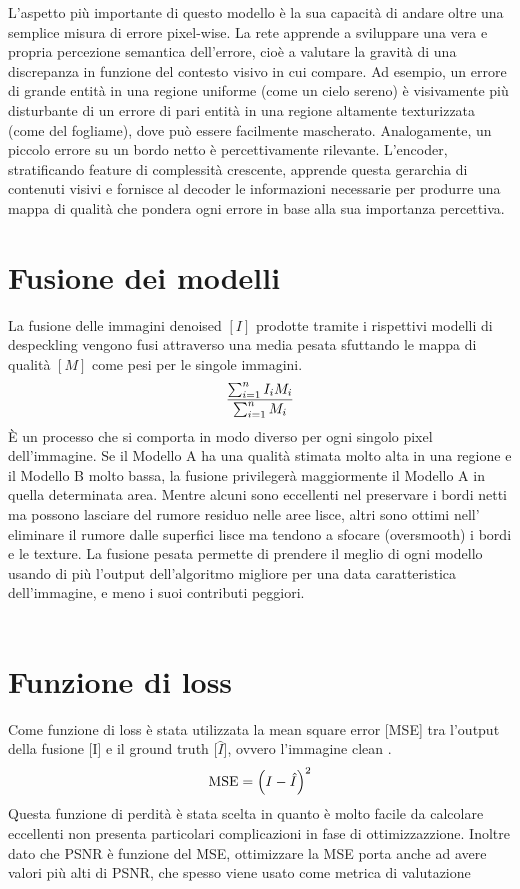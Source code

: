 L’aspetto più importante di questo modello è la sua capacità di andare oltre una semplice misura di errore pixel-wise. 
La rete apprende a sviluppare una vera e propria percezione semantica dell’errore, cioè a valutare la gravità di una 
discrepanza in funzione del contesto visivo in cui compare. Ad esempio, un errore di grande entità in una regione 
uniforme (come un cielo sereno) è visivamente più disturbante di un errore di pari entità in una regione altamente 
texturizzata (come del fogliame), dove può essere facilmente mascherato. Analogamente, un piccolo errore su un bordo 
netto è percettivamente rilevante. L’encoder, stratificando feature di complessità crescente, apprende questa gerarchia 
di contenuti visivi e fornisce al decoder le informazioni necessarie per produrre una mappa di qualità che pondera 
ogni errore in base alla sua importanza percettiva.

\section{Fusione dei modelli}
La fusione delle immagini denoised $[I]$ prodotte tramite i rispettivi modelli di despeckling vengono fusi attraverso una media pesata sfuttando
le mappa di qualità $[M]$ come pesi per le singole immagini.
\begin{equation}
    \makebox[\textwidth][c]{%
      $\displaystyle
        \frac{\sum_{i=1}^{n} I_i M_i}{\sum_{i=1}^{n} M_i}
      $%
    }
\end{equation}
È un processo che si comporta in modo diverso per ogni singolo pixel dell'immagine. Se il Modello A ha una qualità stimata 
molto alta in una regione e il Modello B molto bassa, la fusione privilegerà maggiormente 
il Modello A in quella determinata area. Mentre alcuni sono eccellenti nel preservare i bordi netti ma possono lasciare del rumore residuo nelle aree lisce, 
altri sono ottimi nell' eliminare il rumore dalle superfici lisce ma tendono a sfocare (oversmooth) i bordi e le texture.
La fusione pesata permette di prendere il meglio di ogni modello usando di più l'output dell'algoritmo migliore per una data 
caratteristica dell'immagine, e meno i suoi contributi peggiori.
\\\\
\section{Funzione di loss}
Come funzione di loss è stata utilizzata la mean square error [MSE] tra l'output della fusione [I] 
e il ground truth [$\hat{I}$], ovvero l'immagine clean . 
\begin{equation}
  \makebox[\textwidth][c]{%
    $\displaystyle
    \text{MSE} = \left( I - \hat{I} \right)^2
    $%
  }
\end{equation}
Questa funzione di perdità è stata scelta in quanto è molto facile da calcolare eccellenti 
non presenta particolari complicazioni in fase di ottimizzazzione. Inoltre 
dato che PSNR è funzione del MSE, ottimizzare la MSE porta anche ad avere valori 
più alti di PSNR, che spesso viene usato come metrica di valutazione 

